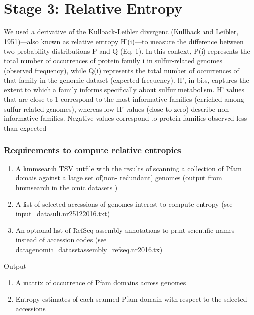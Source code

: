 \documentclass[12pt]{report}
\begin{document}
\section{Stage 3: Relative Entropy}
\label{stage3}

We used a derivative of the Kullback-Leibler divergenc 
(Kullback and Leibler, 1951)—also known as relative entropy 
H’(i)—to measure the difference between two probability 
distributions P and Q (Eq. 1). In this context, P(i) 
represents the total number of occurrences of protein 
family i in sulfur-related genomes (observed frequency), 
while Q(i) represents the total number of occurrences of 
that family in the genomic dataset (expected frequency). 
H’, in bits, captures the extent to which a family informs 
specifically about sulfur metabolism. H’ values that are 
close to 1 correspond to the most informative families 
(enriched among sulfur-related genomes), whereas low H’ 
values (close to zero) describe non-informative families. 
Negative values correspond to protein families observed 
less than expected


\subsubsection{Requirements to compute relative entropies}
\label{entropies_requirements}
\begin{enumerate}
\item  A hmmsearch TSV outfile with the results of scanning 
a collection of Pfam domais against  a large set of(non-
redundant) genomes (output from hmmsearch in the omic 
datasets )
\item A list of selected accessions of genomes interest to compute entropy (see input\_data\/suli.nr25122016.txt)
\item An optional list of RefSeq assembly annotations to print scientific names instead of accession codes (see \/data\/genomic\_dataset\/assembly\_refseq.nr2016.tx)
\end{enumerate}

Output
 \begin{enumerate}
\item A matrix of occurrence of Pfam domains across genomes
\item Entropy estimates of each scanned Pfam domain with respect to the selected accessions
\end{enumerate}
\end{document}
